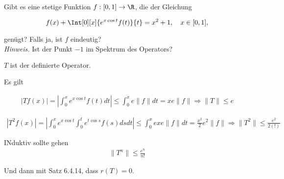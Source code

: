 \begin{exercise}[IO/5]

Gibt es eine stetige Funktion $f: [0, 1] \to \R$, die der Gleichung

\begin{align*}
  f(x) + \Int[0][x]{e^{x \cos{t}} f(t)}{t}
  =
  x^2 + 1,
  \quad
  x \in [0, 1],
\end{align*}

genügt?
Falls ja, ist $f$ eindeutig? \\

\textit{Hinweis.}
Ist der Punkt $-1$ im Spektrum des Operators?

\end{exercise}

\begin{solution}

$T$ ist der definierte Operator.

Es gilt

\begin{align*}
  |Tf(x)| = |\int_{0}^{x} e^{x \cos t} f(t) dt | \leq \int_{0}^{x} e \|f\| dt = xe\|f\| \Rightarrow \|T\| \leq e
\end{align*}

\begin{align*}
  |T^2f(x)| = |\int_{0}^{x} e^{x \cos t} \int_{0}^{t} e^{t \cos s} f(s) ds dt | \leq \int_{0}^{x} e xe\|f\| dt = \frac{x^2}{2}e^2\|f\| \Rightarrow \|T^2\| \leq \frac{e^2}{2(!)}
\end{align*}

INduktiv sollte gehen
\begin{align*}
  \|T^n\| \leq \frac{e^n}{n!}
\end{align*}

Und dann mit Satz 6.4.14, dass $r(T) = 0$.

\end{solution}
